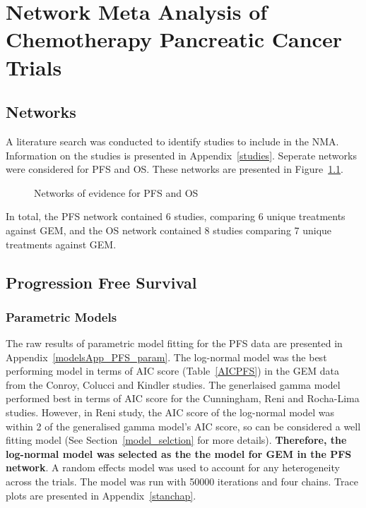 \chapter{Network Meta Analysis of Chemotherapy Pancreatic Cancer Trials}

\section{Networks}

A literature search was conducted to identify studies to include in the NMA. Information on the studies is presented in Appendix~\ref{studies}. Seperate networks were considered for PFS and OS. These networks are presented in Figure~\ref{fig:pfs_os_networks}. 

\begin{figure}[h]
    \centering
    \qquad
    \caption{Networks of evidence for PFS and OS}%
    \label{fig:pfs_os_networks}%
\end{figure}

In total, the PFS network contained 6 studies, comparing 6 unique treatments against GEM, and the OS network contained 8 studies comparing 7 unique treatments against GEM. 

\section{Progression Free Survival}

\subsection{Parametric Models}
The raw results of parametric model fitting for the PFS data are presented in Appendix~\ref{modelsApp_PFS_param}. The log-normal model was the best performing model in terms of AIC score (Table~\ref{AICPFS}) in the GEM data from the Conroy, Colucci and Kindler studies. The generlaised gamma model performed best in terms of AIC score for the Cunningham, Reni and Rocha-Lima studies. However, in Reni study, the AIC score of the log-normal model was within 2 of the generalised gamma model's AIC score, so can be considered a well fitting model (See Section~\ref{model_selction} for more details). \textbf{Therefore, the log-normal model was selected as the the model for GEM in the PFS network}. A random effects model was used to account for any heterogeneity across the trials. The model was run with 50000 iterations and four chains. Trace plots are presented in Appendix~\ref{stanchap}.




